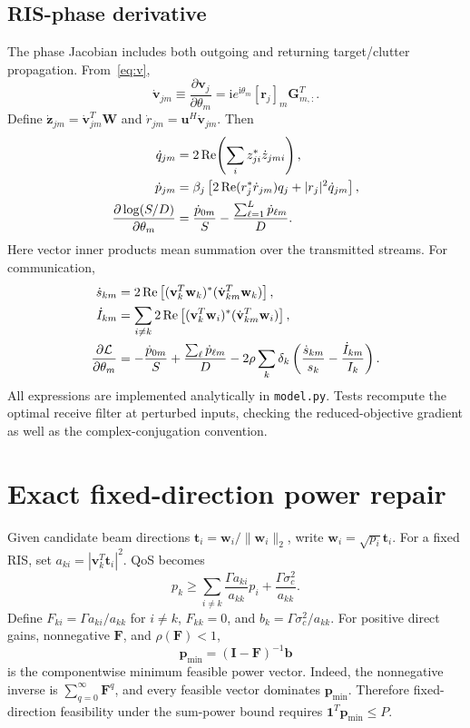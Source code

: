 \documentclass[11pt,a4paper]{article}
\begin{document}
\subsection{RIS-phase derivative}
The phase Jacobian includes both outgoing and returning target/clutter propagation. From~\eqref{eq:v},
\begin{equation}
 \dot{\mathbf v}_{jm}\equiv\frac{\partial\mathbf v_j}{\partial\theta_m}
 =\mathrm i e^{\mathrm i\theta_m}[\mathbf r_j]_m\mathbf G_{m,:}^{T}.
\end{equation}
Define $\dot{\mathbf z}_{jm}=\dot{\mathbf v}_{jm}^{T}\mathbf W$ and $\dot r_{jm}=\mathbf u^H\dot{\mathbf v}_{jm}$. Then
\begin{align}
 \dot q_{jm}&=2\operatorname{Re}\!\left(\sum_i z_{ji}^*\dot z_{jmi}\right),\\
 \dot p_{jm}&=\beta_j\left[2\operatorname{Re}(r_j^*\dot r_{jm})q_j+|r_j|^2\dot q_{jm}\right],\\
 \frac{\partial\log(S/D)}{\partial\theta_m}
 &=\frac{\dot p_{0m}}{S}-\frac{\sum_{\ell=1}^L\dot p_{\ell m}}{D}.
\end{align}
Here vector inner products mean summation over the transmitted streams. For communication,
\begin{align}
 \dot s_{km}&=2\operatorname{Re}\left[(\mathbf v_k^T\mathbf w_k)^*(\dot{\mathbf v}_{km}^T\mathbf w_k)\right],\\
 \dot I_{km}&=\sum_{i\ne k}2\operatorname{Re}\left[(\mathbf v_k^T\mathbf w_i)^*(\dot{\mathbf v}_{km}^T\mathbf w_i)\right],\\
 \frac{\partial\mathcal L}{\partial\theta_m}
 &=-\frac{\dot p_{0m}}{S}+\frac{\sum_\ell\dot p_{\ell m}}{D}
 -2\rho\sum_k\delta_k\left(\frac{\dot s_{km}}{s_k}-\frac{\dot I_{km}}{I_k}\right).
\end{align}
All expressions are implemented analytically in \texttt{model.py}. Tests recompute the optimal receive filter at perturbed inputs, checking the reduced-objective gradient as well as the complex-conjugation convention.

\section{Exact fixed-direction power repair}
Given candidate beam directions $\mathbf t_i=\mathbf w_i/\|\mathbf w_i\|_2$, write $\mathbf w_i=\sqrt{p_i}\mathbf t_i$. For a fixed RIS, set $a_{ki}=|\mathbf v_k^T\mathbf t_i|^2$. QoS becomes
\begin{equation}
 p_k\geq\sum_{i\ne k}\frac{\Gamma a_{ki}}{a_{kk}}p_i+\frac{\Gamma\sigma_c^2}{a_{kk}}.
\end{equation}
Define $F_{ki}=\Gamma a_{ki}/a_{kk}$ for $i\ne k$, $F_{kk}=0$, and $b_k=\Gamma\sigma_c^2/a_{kk}$. For positive direct gains, nonnegative $\mathbf F$, and $\rho(\mathbf F)<1$,
\begin{equation}
 \mathbf p_{\min}=(\mathbf I-\mathbf F)^{-1}\mathbf b
\end{equation}
is the componentwise minimum feasible power vector. Indeed, the nonnegative inverse is $\sum_{q=0}^{\infty}\mathbf F^q$, and every feasible vector dominates $\mathbf p_{\min}$. Therefore fixed-direction feasibility under the sum-power bound requires $\mathbf 1^T\mathbf p_{\min}\leq P$.
\end{document}
